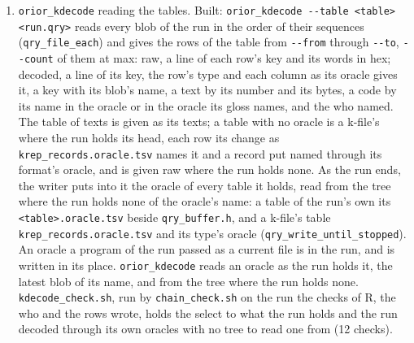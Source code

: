 \begin{enumerate}
\begin{enumerate}
\item The cross's pairs (\texttt{klq\_\allowbreak{}identity.\allowbreak{}cu}), the writers' files (\texttt{qry\_\allowbreak{}filed\_\allowbreak{}by}), and the links between rows. Built: every pair the pair mode retains is a row of the run's pairs, its two forms' texts, closed or open, its count of cases alike, the case that closed it, the hash of what its put reads and its verdict's text (\texttt{pairs.\allowbreak{}oracle.\allowbreak{}tsv}); every file written is a row of the run's files, passed critical after its bytes in place of the blob that followed them, its who, its bytes' blob and its path (\texttt{files.\allowbreak{}oracle.\allowbreak{}tsv}); and a k-file written as a view of its table has its bytes' blob linked to the head row of its rows, the one link a column of a row cannot hold so far (\texttt{links.\allowbreak{}oracle.\allowbreak{}tsv}). \texttt{who\_\allowbreak{}check} holds a file's row to its who, its sequence and its path, and \texttt{kqr\_\allowbreak{}check} holds the link. No pair row has been made: the pair mode has not run since.
\end{enumerate}
\item \texttt{orior\_\allowbreak{}kdecode} reading the tables. Built: \texttt{orior\_\allowbreak{}kdecode -\allowbreak{}-\allowbreak{}table <table> <run.\allowbreak{}qry>} reads every blob of the run in the order of their sequences (\texttt{qry\_\allowbreak{}file\_\allowbreak{}each}) and gives the rows of the table from \texttt{-\allowbreak{}-\allowbreak{}from} through \texttt{-\allowbreak{}-\allowbreak{}to}, \texttt{-\allowbreak{}-\allowbreak{}count} of them at max: raw, a line of each row's key and its words in hex; decoded, a line of its key, the row's type and each column as its oracle gives it, a key with its blob's name, a text by its number and its bytes, a code by its name in the oracle or in the oracle its gloss names, and the who named. The table of texts is given as its texts; a table with no oracle is a k-file's where the run holds its head, each row its change as \texttt{krep\_\allowbreak{}records.\allowbreak{}oracle.\allowbreak{}tsv} names it and a record put named through its format's oracle, and is given raw where the run holds none. As the run ends, the writer puts into it the oracle of every table it holds, read from the tree where the run holds none of the oracle's name: a table of the run's own its \texttt{<table>.\allowbreak{}oracle.\allowbreak{}tsv} beside \texttt{qry\_\allowbreak{}buffer.\allowbreak{}h}, and a k-file's table \texttt{krep\_\allowbreak{}records.\allowbreak{}oracle.\allowbreak{}tsv} and its type's oracle (\texttt{qry\_\allowbreak{}write\_\allowbreak{}until\_\allowbreak{}stopped}). An oracle a program of the run passed as a current file is in the run, and is written in its place. \texttt{orior\_\allowbreak{}kdecode} reads an oracle as the run holds it, the latest blob of its name, and from the tree where the run holds none. \texttt{kdecode\_\allowbreak{}check.\allowbreak{}sh}, run by \texttt{chain\_\allowbreak{}check.\allowbreak{}sh} on the run the checks of R, the who and the rows wrote, holds the select to what the run holds and the run decoded through its own oracles with no tree to read one from (12 checks).

\end{enumerate}
